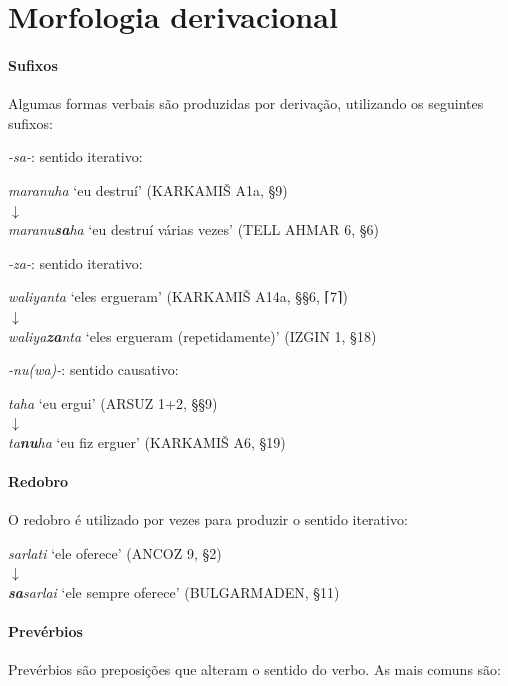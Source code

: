\section{Morfologia derivacional}

\paragraph{Sufixos}
Algumas formas verbais são produzidas por derivação, utilizando os seguintes
sufixos:
\begin{compactenum}[(a)]
	\item \emph{-sa-}: sentido iterativo:
	\begin{center}
		\emph{maranuha} `eu destruí' (KARKAMIŠ A1a, §9)\\
		$\downarrow$\\
		\emph{maranu\textbf{sa}ha} `eu destruí várias vezes' (TELL AHMAR 6, §6)
	\end{center}
	\item \emph{-za-}: sentido iterativo:
	\begin{center}
		\emph{waliyanta} `eles ergueram' (KARKAMIŠ A14a, §§6, \textsc{⌈}7\textsc{⌉})\\
		$\downarrow$\\
		\emph{waliya\textbf{za}nta} `eles ergueram (repetidamente)' (IZGIN 1, §18)
	\end{center}
	\item \emph{-nu{(wa)}-}: sentido causativo:
	\begin{center}
		\emph{taha} `eu ergui' (ARSUZ 1+2, §§9)\\
		$\downarrow$\\
		\emph{ta\textbf{nu}ha} `eu fiz erguer' (KARKAMIŠ A6, §19)
	\end{center}
\end{compactenum}

\paragraph{Redobro}
O redobro é utilizado por vezes para produzir o sentido iterativo:
\begin{center}
	\emph{sarlati} `ele oferece' (ANCOZ 9, §2)\\
	$\downarrow$\\
	\emph{\textbf{sa}sarlai} `ele sempre oferece' (BULGARMADEN, §11)
\end{center}

\paragraph{Prevérbios}
Prevérbios são preposições que alteram o sentido do verbo.
As mais comuns são:

